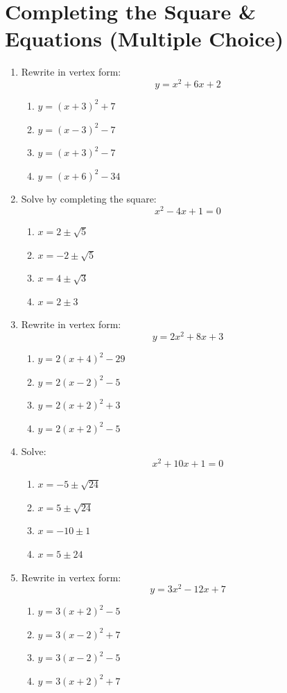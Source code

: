 \documentclass[12pt]{article}
\begin{document}
\section*{Completing the Square \& Equations (Multiple Choice)}

\begin{enumerate}

\item Rewrite in vertex form:
\[
y = x^2 + 6x + 2
\]
\begin{enumerate}
\item $y = (x+3)^2 + 7$
\item $y = (x-3)^2 - 7$
\item $y = (x+3)^2 - 7$
\item $y = (x+6)^2 - 34$
\end{enumerate}

\item Solve by completing the square:
\[
x^2 - 4x + 1 = 0
\]
\begin{enumerate}
\item $x = 2 \pm \sqrt{5}$
\item $x = -2 \pm \sqrt{5}$
\item $x = 4 \pm \sqrt{3}$
\item $x = 2 \pm 3$
\end{enumerate}

\item Rewrite in vertex form:
\[
y = 2x^2 + 8x + 3
\]
\begin{enumerate}
\item $y = 2(x+4)^2 - 29$
\item $y = 2(x-2)^2 - 5$
\item $y = 2(x+2)^2 + 3$
\item $y = 2(x+2)^2 - 5$
\end{enumerate}

\item Solve:
\[
x^2 + 10x + 1 = 0
\]
\begin{enumerate}
\item $x = -5 \pm \sqrt{24}$
\item $x = 5 \pm \sqrt{24}$
\item $x = -10 \pm 1$
\item $x = 5 \pm 24$
\end{enumerate}

\item Rewrite in vertex form:
\[
y = 3x^2 - 12x + 7
\]
\begin{enumerate}
\item $y = 3(x+2)^2 - 5$
\item $y = 3(x-2)^2 + 7$
\item $y = 3(x-2)^2 - 5$
\item $y = 3(x+2)^2 + 7$
\end{enumerate}


\end{enumerate}
\end{document}
